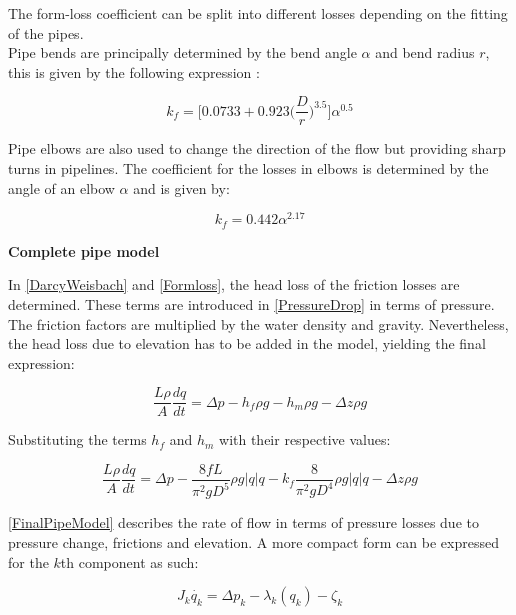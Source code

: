 The form-loss coefficient can be split into different losses depending on the 
fitting of the pipes. 
\\
Pipe bends are principally determined by the 
bend angle $\alpha$ and bend radius $r$, this is given by the following 
expression \cite{Design_Water}: 

\begin{equation}
  k_f = \bigg[0.0733 + 0.923 \bigg(\frac{D}{r}\bigg)^{3.5}\bigg]\alpha^{0.5}
  \label{kfriction}
\end{equation}

Pipe elbows are also used to change the direction of the flow but providing 
sharp turns in pipelines. The coefficient for the losses in elbows is determined by the angle of an elbow $\alpha$ and is given by:

\begin{equation}
  k_f = 0.442\alpha^{2.17}
\end{equation}

\textbf{Complete pipe model}
\label{CompletePipe}    %

In \eqref{DarcyWeisbach} and \eqref{Formloss}, the head loss of the friction losses are determined. These terms are introduced in \eqref{PressureDrop} in terms of pressure. The friction factors are multiplied by the water density and gravity. Nevertheless, the head loss due to elevation has to be added in the model, yielding the final expression:

\begin{equation}
   \frac{L \rho}{A} \frac{dq}{dt} =\Delta p - h_f \rho g - h_m \rho g - \Delta z \rho 
   g
\end{equation}

Substituting the terms $h_f$ and $h_m$ with their respective values:

\begin{equation}
\label{FinalPipeModel}
   \frac{L \rho}{A} \frac{dq}{dt} =\Delta p - \frac{8fL}{\pi^{2}gD^5} \rho g  |q| q - k_f \frac{8}{\pi^2gD^4} \rho g |q| q - \Delta z \rho g 
\end{equation}

\eqref{FinalPipeModel} describes the rate of flow in terms of pressure losses due to pressure change, frictions and elevation. A more compact form can be expressed for the $k$th component as such:

\begin{equation}
\label{FinalPipeModelCompact}
   J_k \dot{q_k} = \Delta p_k - \lambda_k(q_k) - \zeta_k 
\end{equation}

